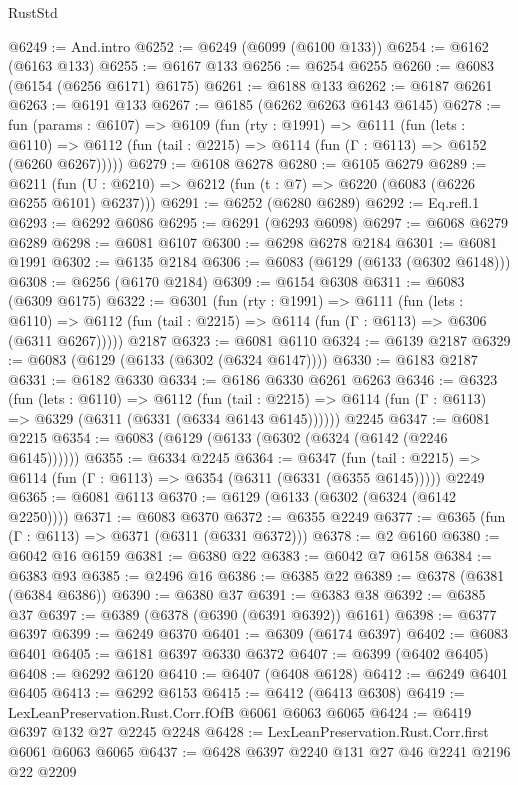 \begin{lexlean}{RustStd}
\begin{coremodule}
@6249 := And.intro
@6252 := @6249 (@6099 (@6100 @133))
@6254 := @6162 (@6163 @133)
@6255 := @6167 @133
@6256 := @6254 @6255
@6260 := @6083 (@6154 (@6256 @6171) @6175)
@6261 := @6188 @133
@6262 := @6187 @6261
@6263 := @6191 @133
@6267 := @6185 (@6262 @6263 @6143 @6145)
@6278 := fun (params : @6107) =>
  @6109
    (fun (rty : @1991) =>
    @6111
      (fun (lets : @6110) =>
      @6112 (fun (tail : @2215) => @6114 (fun (Γ : @6113) => @6152 (@6260 @6267)))))
@6279 := @6108 @6278
@6280 := @6105 @6279
@6289 := @6211 (fun (U : @6210) => @6212 (fun (t : @7) => @6220 (@6083 (@6226 @6255 @6101) @6237)))
@6291 := @6252 (@6280 @6289)
@6292 := Eq.refl.{1}
@6293 := @6292 @6086
@6295 := @6291 (@6293 @6098)
@6297 := @6068 @6279 @6289
@6298 := @6081 @6107
@6300 := @6298 @6278 @2184
@6301 := @6081 @1991
@6302 := @6135 @2184
@6306 := @6083 (@6129 (@6133 (@6302 @6148)))
@6308 := @6256 (@6170 @2184)
@6309 := @6154 @6308
@6311 := @6083 (@6309 @6175)
@6322 := @6301
    (fun (rty : @1991) =>
    @6111
      (fun (lets : @6110) =>
      @6112 (fun (tail : @2215) => @6114 (fun (Γ : @6113) => @6306 (@6311 @6267)))))
    @2187
@6323 := @6081 @6110
@6324 := @6139 @2187
@6329 := @6083 (@6129 (@6133 (@6302 (@6324 @6147))))
@6330 := @6183 @2187
@6331 := @6182 @6330
@6334 := @6186 @6330 @6261 @6263
@6346 := @6323
    (fun (lets : @6110) =>
    @6112
      (fun (tail : @2215) => @6114 (fun (Γ : @6113) => @6329 (@6311 (@6331 (@6334 @6143 @6145))))))
    @2245
@6347 := @6081 @2215
@6354 := @6083 (@6129 (@6133 (@6302 (@6324 (@6142 (@2246 @6145))))))
@6355 := @6334 @2245
@6364 := @6347
    (fun (tail : @2215) => @6114 (fun (Γ : @6113) => @6354 (@6311 (@6331 (@6355 @6145)))))
    @2249
@6365 := @6081 @6113
@6370 := @6129 (@6133 (@6302 (@6324 (@6142 @2250))))
@6371 := @6083 @6370
@6372 := @6355 @2249
@6377 := @6365 (fun (Γ : @6113) => @6371 (@6311 (@6331 @6372)))
@6378 := @2 @6160
@6380 := @6042 @16 @6159
@6381 := @6380 @22
@6383 := @6042 @7 @6158
@6384 := @6383 @93
@6385 := @2496 @16
@6386 := @6385 @22
@6389 := @6378 (@6381 (@6384 @6386))
@6390 := @6380 @37
@6391 := @6383 @38
@6392 := @6385 @37
@6397 := @6389 (@6378 (@6390 (@6391 @6392)) @6161)
@6398 := @6377 @6397
@6399 := @6249 @6370
@6401 := @6309 (@6174 @6397)
@6402 := @6083 @6401
@6405 := @6181 @6397 @6330 @6372
@6407 := @6399 (@6402 @6405)
@6408 := @6292 @6120
@6410 := @6407 (@6408 @6128)
@6412 := @6249 @6401 @6405
@6413 := @6292 @6153
@6415 := @6412 (@6413 @6308)
@6419 := LexLeanPreservation.Rust.Corr.fOfB @6061 @6063 @6065
@6424 := @6419 @6397 @132 @27 @2245 @2248
@6428 := LexLeanPreservation.Rust.Corr.first @6061 @6063 @6065
@6437 := @6428 @6397 @2240 @131 @27 @46 @2241 @2196 @22 @2209

\end{coremodule}
\end{lexlean}
